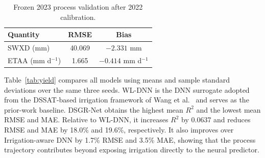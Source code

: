 \documentclass{article}
\begin{document}
\begin{table}[t]
\centering
\caption{Frozen 2023 process validation after 2022 calibration.}
\label{tab:process}
\begin{tabular}{lcc}
\toprule
Quantity & RMSE & Bias\\
\midrule
SWXD (mm) & 40.069 & $-2.331$ mm\\
ETAA (mm d$^{-1}$) & 1.665 & $-0.414$ mm d$^{-1}$\\
\bottomrule
\end{tabular}
\end{table}

Table~\ref{tab:yield} compares all models using means and sample standard deviations over the same three seeds. WL-DNN is the DNN surrogate adopted from the DSSAT-based irrigation framework of Wang et al.~\cite{wang2025} and serves as the prior-work baseline. DSGR-Net obtains the highest mean $R^2$ and the lowest mean RMSE and MAE. Relative to WL-DNN, it increases $R^2$ by 0.0637 and reduces RMSE and MAE by 18.0\% and 19.6\%, respectively. It also improves over Irrigation-aware DNN by 1.7\% RMSE and 3.5\% MAE, showing that the process trajectory contributes beyond exposing irrigation directly to the neural predictor.

\begin{table}[t]
\centering
\caption{Grouped test-set results, averaged over seeds 42, 43, and 44. Best results are in bold.}
\label{tab:yield}
\scriptsize
\setlength{\tabcolsep}{2.2pt}
\end{table}
\end{document}
